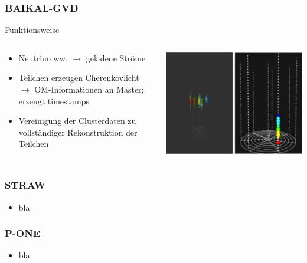 \documentclass[aspectratio=1610, 9pt]{beamer}
\begin{document}
\begin{frame}\frametitle{BAIKAL-GVD}
  \begin{block}{Funktionsweise}
    \begin{columns}
    \begin{column}[c]{0.45\textwidth}
      \begin{itemize}
        \item Neutrino ww. $\to$ geladene Str\"ome
        \item Teilchen erzeugen Cherenkovlicht $\to$ OM-Informationen an Master; erzeugt timestamps
        \item Vereinigung der Clusterdaten zu vollst\"andiger Rekonstruktion der Teilchen
      \end{itemize}
    \end{column}
    \begin{column}[c]{0.45\textwidth}
      \includegraphics{images/baikal2.png}
    \end{column}
    \end{columns}
  \end{block}
\end{frame}


\begin{frame}\frametitle{STRAW}
  \begin{itemize}
    \item bla
  \end{itemize}
\end{frame}

\begin{frame}\frametitle{P-ONE}
  \begin{itemize}
    \item bla
  \end{itemize}
\end{frame}
\end{document}
